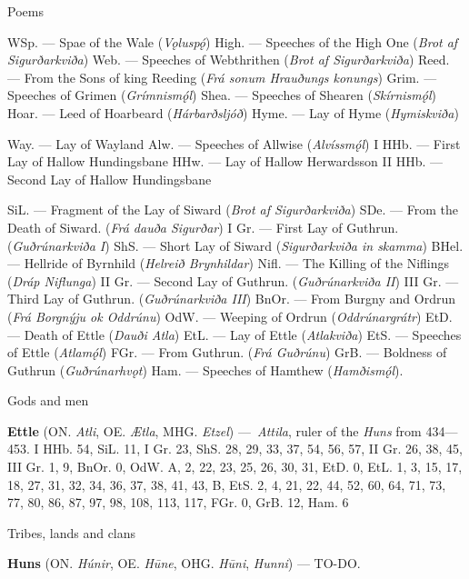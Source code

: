 Poems

WSp. — Spae of the Wale (\emph{Vǫluspǫ́})
High. — Speeches of the High One (\emph{Brot af Sigurðarkviða})
Web. — Speeches of Webthrithen (\emph{Brot af Sigurðarkviða})
Reed. — From the Sons of king Reeding (\emph{Frá sonum Hrauðungs konungs})
Grim. — Speeches of Grimen (\emph{Grímnismǫ́l})
Shea. — Speeches of Shearen (\emph{Skírnismǫ́l})
Hoar. — Leed of Hoarbeard (\emph{Hárbarðsljóð})
Hyme. — Lay of Hyme (\emph{Hymiskviða})

Way. — Lay of Wayland
Alw. — Speeches of Allwise (\emph{Alvíssmǫ́l})
I HHb. — First Lay of Hallow Hundingsbane
HHw. — Lay of Hallow Herwardsson
II HHb. — Second Lay of Hallow Hundingsbane

SiL. — Fragment of the Lay of Siward (\emph{Brot af Sigurðarkviða})
SDe. — From the Death of Siward. (\emph{Frá dauða Sigurðar})
I Gr. — First Lay of Guthrun. (\emph{Guðrúnarkviða I})
ShS. — Short Lay of Siward (\emph{Sigurðarkviða in skamma})
BHel. — Hellride of Byrnhild (\emph{Helreið Brynhildar})
Nifl. — The Killing of the Niflings (\emph{Dráp Niflunga})
II Gr. — Second Lay of Guthrun. (\emph{Guðrúnarkviða II})
III Gr. — Third Lay of Guthrun. (\emph{Guðrúnarkviða III})
BnOr. — From Burgny and Ordrun (\emph{Frá Borgnýju ok Oddrúnu})
OdW. — Weeping of Ordrun (\emph{Oddrúnargrátr})
EtD. — Death of Ettle (\emph{Dauði Atla})
EtL. — Lay of Ettle (\emph{Atlakviða})
EtS. — Speeches of Ettle (\emph{Atlamǫ́l})
FGr. — From Guthrun. (\emph{Frá Guðrúnu})
GrB. — Boldness of Guthrun (\emph{Guðrúnarhvǫt})
Ham. — Speeches of Hamthew (\emph{Hamðismǫ́l}).

Gods and men

\textbf{Ettle} (ON. \emph{Atli}, OE. \emph{Ætla}, MHG. \emph{Etzel}) — \emph{Attila}, ruler of the \emph{Huns} from 434—453.
 I HHb. 54, SiL. 11, I Gr. 23, ShS. 28, 29, 33, 37, 54, 56, 57, II Gr. 26, 38, 45, III Gr. 1, 9, BnOr. 0, OdW. A, 2, 22, 23, 25, 26, 30, 31, EtD. 0, EtL. 1, 3, 15, 17, 18, 27, 31, 32, 34, 36, 37, 38, 41, 43, B, EtS. 2, 4, 21, 22, 44, 52, 60, 64, 71, 73, 77, 80, 86, 87, 97, 98, 108, 113, 117, FGr. 0, GrB. 12, Ham. 6

Tribes, lands and clans

\textbf{Huns} (ON. \emph{Húnir}, OE. \emph{Hūne}, OHG. \emph{Hūni}, \emph{Hunni}) — TO-DO.
